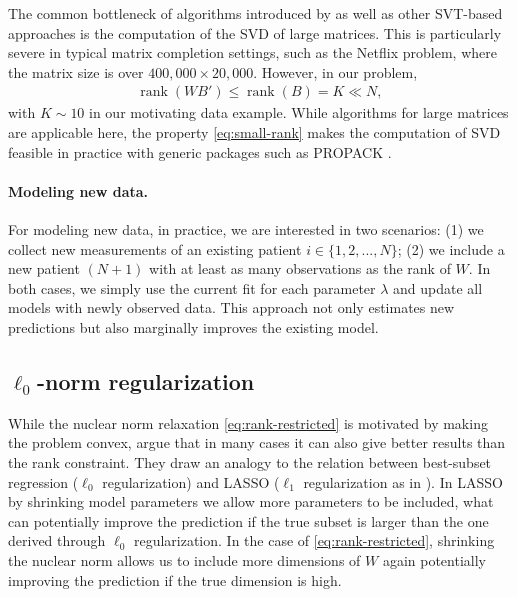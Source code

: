 \documentclass[preprint]{imsart}
\numberwithin{equation}{section}
\theoremstyle{plain}
\newcommand{\tr}[1]{{\textcolor{red}{#1}}}
\DeclareMathOperator*{\rank}{rank}
\begin{document}
The common bottleneck of algorithms introduced by \citet{cai2010singular,mazumder2010spectral,ma2011fixed} as well as other SVT-based approaches is the computation of the SVD of large matrices. This is particularly severe in typical matrix completion settings, such as the Netflix problem, where the matrix size is over $400{,}000 \times 20{,}000$. However, in our problem,
\begin{align}\label{eq:small-rank}
  \rank(WB') \leq \rank(B) = K \ll N,
\end{align}
with $K \sim 10$ in our motivating data example. While algorithms for large matrices are applicable here, the property \eqref{eq:small-rank} makes the computation of SVD feasible in practice with generic packages such as PROPACK \citep{larsen2004propack}.

\paragraph{Modeling new data.}

For modeling new data, in practice, we are interested in two scenarios: (1) we collect new measurements of an existing patient $i \in \{1,2,...,N\}$; (2) we include a new patient $(N+1)$ with at least as many observations as the rank of $W$. In both cases, we simply use the current fit for each parameter $\lambda$ and update all models with newly observed data. This approach not only estimates new predictions but also marginally improves the existing model. 




\subsection{$\ell_0$-norm regularization}

While the nuclear norm relaxation \eqref{eq:rank-restricted} is motivated by making the problem convex, \citet{mazumder2010spectral} argue that in many cases it can also give better results than the rank constraint. They draw an analogy to the relation between best-subset regression ($\ell_0$ regularization) and LASSO ($\ell_1$ regularization as in \citet{tibshirani1996regression, friedman2001elements}). In LASSO by shrinking model parameters we allow more parameters to be included, what can potentially improve the prediction if the true subset is larger than the one derived through $\ell_0$ regularization. In the case of \eqref{eq:rank-restricted}, shrinking the nuclear norm allows us to include more dimensions of $W$ again potentially improving the prediction if the true dimension is high.
\end{document}
